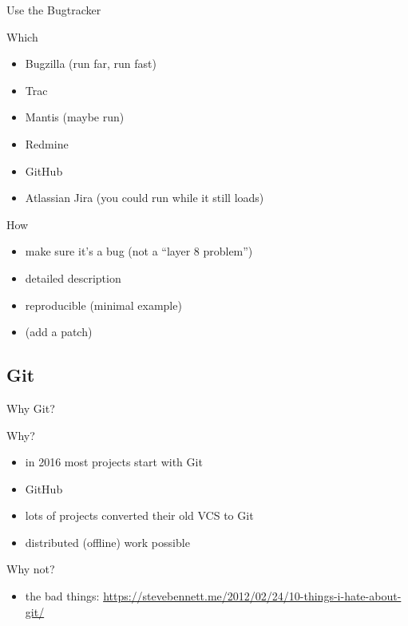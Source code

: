 \documentclass{beamer}
\begin{document}
\begin{frame}{Use the Bugtracker}
    \begin{block}{Which}
        \begin{itemize}
            \item Bugzilla (run far, run fast)
            \item Trac
            \item Mantis (maybe run)
            \item Redmine
            \item GitHub
            \item Atlassian Jira (you could run while it still loads)
        \end{itemize}
    \end{block}
    \pause
    \begin{block}{How}
        \begin{itemize}
            \item make sure it's a bug (not a \enquote{layer 8 problem})
            \item detailed description
            \item reproducible (minimal example)
            \item (add a patch)
        \end{itemize}
    \end{block}
\end{frame}

\subsection{Git}

\begin{frame}{Why Git?}
    \begin{exampleblock}{Why?}
        \begin{itemize}
            \item in 2016 most projects start with Git
            \item GitHub
            \item lots of projects converted their old VCS to Git
            \item distributed (offline) work possible
        \end{itemize}
    \end{exampleblock}
    \pause
    \begin{alertblock}{Why not?}
        \begin{itemize}
            \item the bad things: \url{https://stevebennett.me/2012/02/24/10-things-i-hate-about-git/}
        \end{itemize}
    \end{alertblock}
\end{frame}
\end{document}
